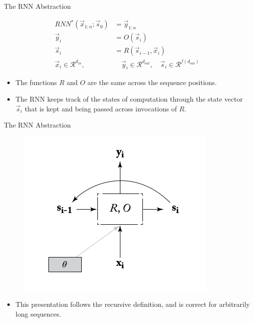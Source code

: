 \documentclass[handout]{beamer}
\begin{document}
\begin{frame}{The RNN Abstraction}
\begin{scriptsize}

\begin{equation}
\begin{split}
 RNN^{*}(\vec{x}_{1:n};\vec{s}_0) & = \vec{y}_{1:n} \\
\vec{y}_i & = O(\vec{s}_i) \\
\vec{s}_i & = R(\vec{s}_{i-1},\vec{x}_i) \\
\vec{x}_i \in \mathcal{R}^{d_{in}}, & \quad \vec{y}_i \in \mathcal{R}^{d_{out}}, \quad \vec{s}_i \in \mathcal{R}^{f(d_{out})}
\end{split}
\end{equation}
\begin{itemize}
\item The functions $R$ and $O$ are the same across the sequence positions. 
\item The RNN keeps track of the states of computation through the state vector $\vec{s}_i$ that is kept and being passed across invocations of $R$.


\end{itemize}
\end{scriptsize}
\end{frame}




\begin{frame}{The RNN Abstraction}
\begin{scriptsize}

  \begin{figure}[h]
        	\includegraphics[scale = 0.4]{pics/RNN.png}
        \end{figure}
\begin{itemize}
\item This presentation follows the recursive definition, and is correct for arbitrarily long sequences.
\end{itemize}
\end{scriptsize}
\end{frame}
\end{document}

